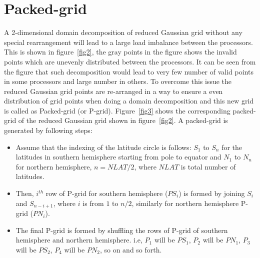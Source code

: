 \documentclass{SBCbookchapter}
\begin{document}
\section{Packed-grid}
A 2-dimensional domain decomposition of reduced Gaussian grid without any special rearrangement will lead to a large load imbalance between the processors. This is shown in figure~\ref{fig2}, the gray points in the figure shows the invalid points which are unevenly distributed between the processors. It can be seen from the figure that such decomposition would lead to very few number of valid points in some processors and large number in others. To overcome this issue the reduced Gaussian grid points are re-arranged in a way to ensure a even distribution of grid points when doing a domain decomposition and this new grid is called as Packed-grid (or P-grid). Figure~\ref{fig3} shows the corresponding packed-grid of the reduced Gaussian grid shown in figure~\ref{fig2}.
A packed-grid is generated by following steps:  
\begin{itemize}
	\item Assume that the indexing of the latitude circle is follows: $S_1$ to $S_{n}$ for the latitudes in southern hemisphere starting from pole to equator and $N_1$ to $N_{n}$ for northern hemisphere, $n=NLAT/2$, where $NLAT$ is total number of latitudes.
	\item Then, $i^{th}$ row of P-grid for southern hemisphere ($PS_{i}$) is formed by joining $S_{i}$ and $S_{n-i+1}$, where $i$ is from $1$ to $n/2$, similarly for northern hemisphere P-grid ($PN_{i}$).
	\item The final P-grid is formed by shuffling the rows of P-grid of southern hemisphere and northern hemisphere. i.e, $P_1$ will be $PS_1$, $P_2$ will be $PN_1$, $P_3$ will be $PS_2$, $P_4$ will be $PN_2$, so on and so forth.
\end{itemize}
\end{document}

